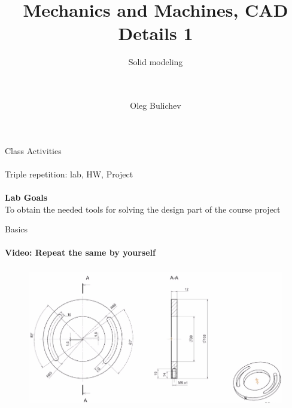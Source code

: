 \documentclass[aspectratio=169]{beamer}
\title[MaM]{Mechanics and Machines, CAD Details 1} %
\subtitle{Solid modeling
\\ \  \\ \ 
         } %
\author{Oleg Bulichev}
\newcommand{\fbckg}[1]{\usebackgroundtemplate{\texttt{[image: \#1]}}}%
\begin{document}
\setlength{\abovedisplayskip}{0pt}
\setlength{\belowdisplayskip}{0pt}
\setlength{\abovedisplayshortskip}{0pt}
\setlength{\belowdisplayshortskip}{0pt}

\fbckg{fibeamer/figs/title_page.png}

\fbckg{fibeamer/figs/common.png}

\note{\scriptsize \begin{itemize}
        \item \
    \end{itemize}}

\begin{frame}[c]{Class Activities}
\framesubtitle{}
    \centering \LARGE
    Triple repetition: lab, HW, Project
\end{frame}

\begin{frame}[c]{}
\framesubtitle{}
\centering \LARGE \textbf{Lab Goals} \\
To obtain the needed tools for solving the design part of the course project
\end{frame}


\begin{frame}[t]{Basics}
    \framesubtitle{Video: Repeat the same by yourself}
    \vspace{-0.6cm}
    \begin{figure}[H]
        \href{https://disk.yandex.ru/d/DQ8daMqRHrt2iw}{
            \centering\includegraphics[height=6cm,width=1\textwidth,keepaspectratio]{resources/task_0.png}}
        \label{fig:1}
    \end{figure}
\end{frame}
\end{document}
